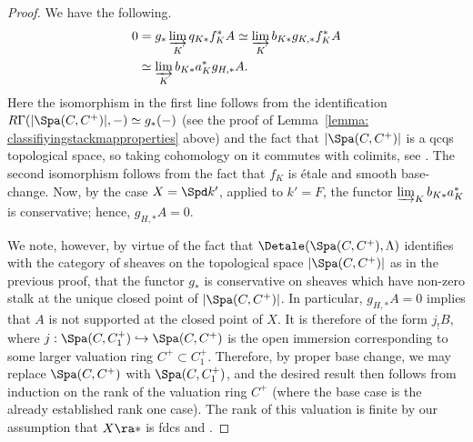 \documentclass[letterpaper,11pt]{amsart}
\begin{document}
\begin{proof}
We have the following.
\begin{align*}
    0 &= g_\ast\varinjlim_Kq_{K*}f_{K}^{*}A\simeq \varinjlim_Kb_{K*}g_{K,\ast}f_{K}^{*}A\\
    &\simeq \varinjlim_Kb_{K*}a_{K}^{*} g_{H,\ast}A.
\end{align*}
Here the isomorphism in the first line follows from the identification $R\Gamma(|\Spa(C,C^{+})|,-) \simeq g_{*}(-)$ (see the proof of Lemma~\ref{lemma: classifiyingstackmapproperties} above) and the fact that $|\Spa(C,C^{+})|$ is a qcqs topological space, so taking cohomology on it commutes with colimits, see \cite[Tag~0739]{stacks-project}. The second isomorphism follows from the fact that $f_{K}$ is \'etale and smooth base-change. Now, by the case $X=\Spd k'$, applied to $k'=F$, the functor $\varinjlim_K b_{K*}a_{K}^{*}$ is conservative; hence, $g_{H,\ast}A=0$.

We note, however, by virtue of the fact that $\Detale(\Spa(C,C^{+}),\Lambda)$ identifies with the category of sheaves on the topological space $|\Spa(C,C^{+})|$ as in the previous proof, that the functor $g_\ast$ is conservative on sheaves which have non-zero stalk at the unique closed point of $|\Spa(C,C^{+})|$. In particular, $g_{H,\ast}A=0$ implies that $A$ is not supported at the closed point of $X$. It is therefore of the form $j_!B$, where $j: \Spa(C,C^{+}_{1}) \hookrightarrow \Spa(C,C^{+})$ is the open immersion corresponding to some larger valuation ring $C^{+} \subset C^{+}_{1}$. Therefore, by proper base change, we may replace $\Spa(C,C^{+})$ with $\Spa(C,C^{+}_{1})$, and the desired result then follows from induction on
the rank of the valuation ring $C^+$ (where the base case is the already established rank one case). The rank of this valuation is finite by our assumption that $X \ra \ast$ is fdcs and \cite[Lemma 21.6]{Ecod}.


\end{proof}
\end{document}
